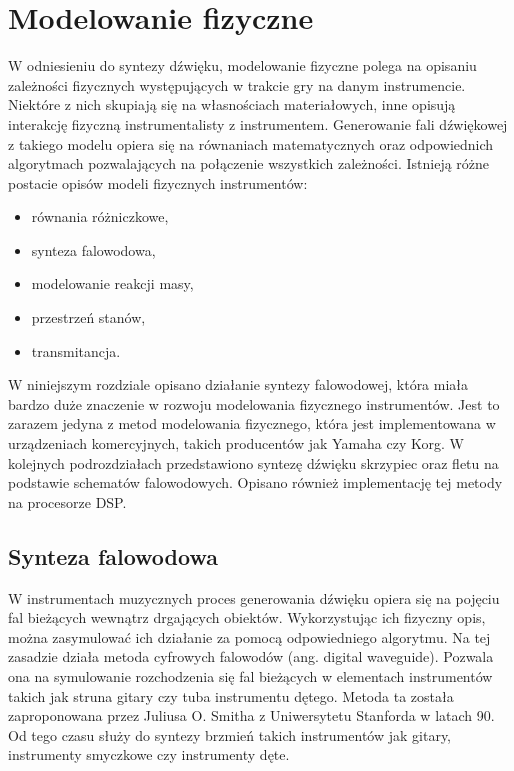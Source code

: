 \chapter{Modelowanie fizyczne}
W odniesieniu do syntezy dźwięku, modelowanie fizyczne polega na opisaniu zależności fizycznych występujących w trakcie gry na danym instrumencie. Niektóre z nich skupiają się na własnościach materiałowych, inne opisują interakcję fizyczną instrumentalisty z instrumentem. Generowanie fali dźwiękowej z takiego modelu opiera się na równaniach matematycznych oraz odpowiednich algorytmach pozwalających na połączenie wszystkich zależności. Istnieją różne postacie opisów modeli fizycznych instrumentów:
\begin{itemize}
	\item równania różniczkowe,
	\item synteza falowodowa,
	\item modelowanie reakcji masy,
	\item przestrzeń stanów,
	\item transmitancja.
\end{itemize}

W niniejszym rozdziale opisano działanie syntezy falowodowej, która miała bardzo duże znaczenie w rozwoju modelowania fizycznego instrumentów. Jest to zarazem jedyna z metod modelowania fizycznego, która jest implementowana w urządzeniach komercyjnych, takich producentów jak Yamaha czy Korg. W kolejnych podrozdziałach przedstawiono syntezę dźwięku skrzypiec oraz fletu na podstawie schematów falowodowych. Opisano również implementację tej metody na procesorze DSP.


\section{Synteza falowodowa}
W instrumentach muzycznych proces generowania dźwięku opiera się na pojęciu fal bieżących wewnątrz drgających obiektów. Wykorzystując ich fizyczny opis, można zasymulować ich działanie za pomocą odpowiedniego algorytmu. Na tej zasadzie działa metoda cyfrowych falowodów (ang. digital waveguide). Pozwala ona na symulowanie  rozchodzenia się fal bieżących w elementach instrumentów takich jak struna gitary czy tuba instrumentu dętego. Metoda ta została zaproponowana przez Juliusa O. Smitha z Uniwersytetu Stanforda w latach 90. Od tego czasu służy do syntezy brzmień takich instrumentów jak gitary, instrumenty smyczkowe czy instrumenty dęte.

